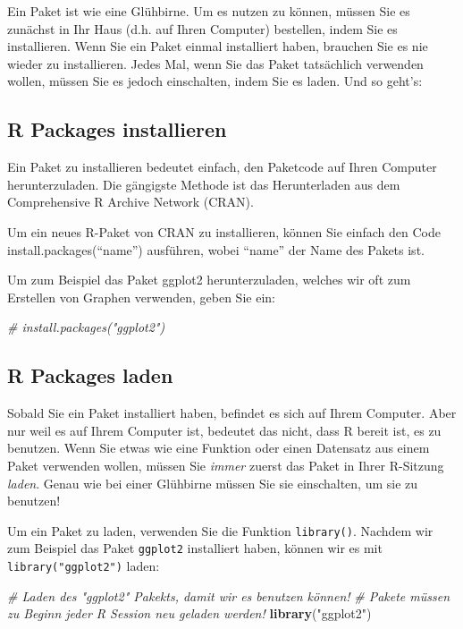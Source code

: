\documentclass[
]{book}
\newenvironment{Shaded}{\begin{snugshade}}{\end{snugshade}}
\newcommand{\CommentTok}[1]{\textcolor[rgb]{0.56,0.35,0.01}{\textit{#1}}}
\newcommand{\FunctionTok}[1]{\textcolor[rgb]{0.13,0.29,0.53}{\textbf{#1}}}
\newcommand{\NormalTok}[1]{#1}
\newcommand{\StringTok}[1]{\textcolor[rgb]{0.31,0.60,0.02}{#1}}
\begin{document}
Ein Paket ist wie eine Glühbirne. Um es nutzen zu können, müssen Sie es zunächst in Ihr Haus (d.h. auf Ihren Computer) bestellen, indem Sie es installieren. Wenn Sie ein Paket einmal installiert haben, brauchen Sie es nie wieder zu installieren. Jedes Mal, wenn Sie das Paket tatsächlich verwenden wollen, müssen Sie es jedoch einschalten, indem Sie es laden. Und so geht's:

\subsection{R Packages installieren}\label{r-packages-installieren}

Ein Paket zu installieren bedeutet einfach, den Paketcode auf Ihren Computer herunterzuladen. Die gängigste Methode ist das Herunterladen aus dem Comprehensive R Archive Network (CRAN).

Um ein neues R-Paket von CRAN zu installieren, können Sie einfach den Code install.packages(``name'') ausführen, wobei ``name'' der Name des Pakets ist.

Um zum Beispiel das Paket ggplot2 herunterzuladen, welches wir oft zum Erstellen von Graphen verwenden, geben Sie ein:

\begin{Shaded}
\begin{Highlighting}[]
\CommentTok{\# install.packages("ggplot2")}
\end{Highlighting}
\end{Shaded}

\subsection{R Packages laden}\label{r-packages-laden}

Sobald Sie ein Paket installiert haben, befindet es sich auf Ihrem Computer. Aber nur weil es auf Ihrem Computer ist, bedeutet das nicht, dass R bereit ist, es zu benutzen. Wenn Sie etwas wie eine Funktion oder einen Datensatz aus einem Paket verwenden wollen, müssen Sie \emph{immer} zuerst das Paket in Ihrer R-Sitzung \emph{laden}. Genau wie bei einer Glühbirne müssen Sie sie einschalten, um sie zu benutzen!

Um ein Paket zu laden, verwenden Sie die Funktion \texttt{library()}. Nachdem wir zum Beispiel das Paket \texttt{ggplot2} installiert haben, können wir es mit \texttt{library("ggplot2")} laden:

\begin{Shaded}
\begin{Highlighting}[]
\CommentTok{\#   Laden des "ggplot2" Pakekts, damit wir es benutzen können!}
\CommentTok{\#   Pakete müssen zu Beginn jeder R Session neu geladen werden!}
\FunctionTok{library}\NormalTok{(}\StringTok{"ggplot2"}\NormalTok{)}
\end{Highlighting}
\end{Shaded}
\end{document}
